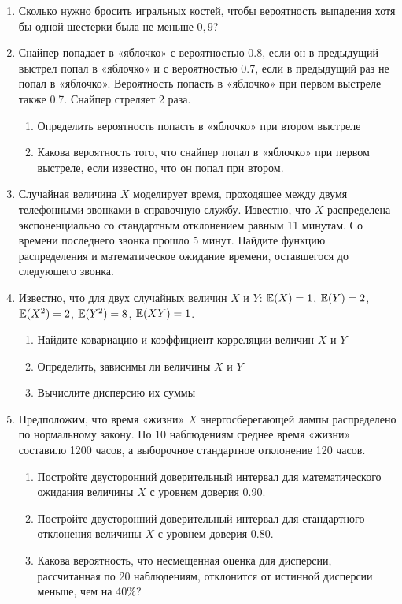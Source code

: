 \documentclass[12pt, a4paper]{article}\usepackage[]{graphicx}\usepackage[]{color}
\begin{document}
\begin{enumerate}

\item Сколько нужно бросить игральных костей, чтобы вероятность выпадения хотя бы одной шестерки была не меньше $0{,}9$?
\item Снайпер попадает в «яблочко» с вероятностью 0.8, если он в предыдущий выстрел попал в «яблочко» и с вероятностью 0.7, если в предыдущий раз не попал в  «яблочко». Вероятность попасть в «яблочко» при первом выстреле также 0.7. Снайпер стреляет 2 раза.
\begin{enumerate}
\item Определить вероятность попасть в «яблочко» при втором выстреле
\item Какова вероятность того, что снайпер попал в «яблочко» при первом выстреле, если известно, что он попал при втором.
\end{enumerate}
\item Случайная величина $X$ моделирует время, проходящее между двумя телефонными звонками в справочную службу. Известно, что $X$ распределена экспоненциально со стандартным отклонением равным 11 минутам. Со времени последнего звонка прошло 5 минут. Найдите функцию распределения и математическое ожидание времени, оставшегося до следующего звонка.
\item Известно, что для двух случайных величин $X$ и $Y$: $\mathbb{E}(X)=1$, $\mathbb{E}(Y)=2$, $\mathbb{E}(X^2)=2$, $\mathbb{E}(Y^2)=8$, $\mathbb{E}(XY)=1$.
\begin{enumerate}
\item Найдите ковариацию и коэффициент корреляции величин $X$ и $Y$
\item Определить, зависимы ли величины $X$ и $Y$
\item Вычислите дисперсию их суммы
\end{enumerate}
\item Предположим, что время «жизни» $X$ энергосберегающей лампы распределено по нормальному закону. По 10 наблюдениям среднее время «жизни» составило 1200 часов, а выборочное стандартное отклонение 120 часов.
\begin{enumerate}
\item Постройте двусторонний доверительный интервал для математического ожидания величины $X$ с уровнем доверия 0.90.
\item Постройте двусторонний доверительный интервал для стандартного отклонения величины $X$ с уровнем доверия 0.80.
\item Какова вероятность, что несмещенная оценка для дисперсии, рассчитанная по 20 наблюдениям, отклонится от истинной дисперсии меньше, чем на 40\%?

\end{enumerate}
\end{enumerate}
\end{document}
